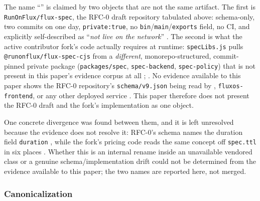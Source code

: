 The name ``'' is claimed by two objects that are not the same artifact. The first is
\texttt{Run\allowbreak{}On\allowbreak{}Flux/\allowbreak{}flux-\allowbreak{}spec}, the RFC-0 draft repository tabulated above: schema-only, two
commits on one day, \texttt{private:\allowbreak true}, no \texttt{bin}\slash\texttt{main}\slash\texttt{exports} field, no CI, and
explicitly self-described as ``\emph{not live on the network}''
. The second is what the active contributor fork's \FluxOS
code actually requires at runtime: \texttt{specLibs.js} pulls
\texttt{@runonflux/\allowbreak{}flux-spec-cjs} from a \emph{different}, monorepo-structured,
commit-pinned private package (\texttt{packages/spec}, \texttt{spec-backend},
\texttt{spec-policy}) that is not present in this paper's evidence corpus at all
;
.
No evidence available to this paper shows the RFC-0 repository's \texttt{schema/v9.json}
being read by \FluxOS, \texttt{fluxos-\allowbreak{}frontend}, or any other deployed service
. This paper therefore does not present the RFC-0 draft
and the fork's implementation as one object.

One concrete divergence was found between them, and it is left unresolved because the
evidence does not resolve it: RFC-0's schema names the duration field \texttt{duration}
, while the fork's pricing code reads the same
concept off \texttt{spec.ttl} in six places
.
Whether this is an internal rename inside an unavailable vendored class or a genuine
schema/implementation drift could not be determined from the evidence available to this
paper; the two names are reported here, not merged.

\subsubsection{Canonicalization}

